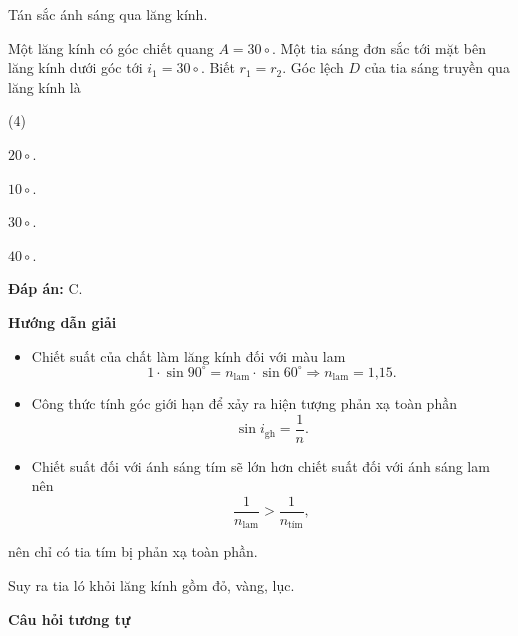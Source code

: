 \begin{dang}{Tán sắc ánh sáng qua lăng kính.}
{		Một lăng kính có góc chiết quang $ A = 30\circ $. Một tia sáng đơn sắc tới mặt bên lăng kính dưới góc tới $ i_{1} = 30\circ $. Biết $ r_{1} = r_{2} $. Góc lệch $ D $ của tia sáng truyền qua lăng kính là
		\begin{mcq}(4)
			\item $ 20 \circ $.
			\item $ 10 \circ $.
			\item $ 30 \circ $.
			\item $ 40 \circ $.
		\end{mcq}
		
		\textbf{Đáp án:} C.
	}
	
	{	\begin{center}
			\textbf{Hướng dẫn giải}
		\end{center}
		
		\begin{itemize}
			\item Chiết suất của chất làm lăng kính đối với màu lam
			\begin{equation*}
				1 \cdot \sin 90^\circ = n_{\text{lam}} \cdot \sin 60^\circ \Rightarrow n_{\text{lam}}=\text{1,15}.
			\end{equation*}
			\item Công thức tính góc giới hạn để xảy ra hiện tượng phản xạ toàn phần
			\begin{equation*}
				\sin i_{\text{gh}}=\dfrac{1}{n}.
			\end{equation*}
			\item Chiết suất đối với ánh sáng tím sẽ lớn hơn chiết suất đối với ánh sáng lam nên 
			\begin{equation*}
				\dfrac{1}{n_{\text{lam}}}>\dfrac{1}{n_{\text{tím}}},
			\end{equation*}
		\end{itemize}
		
		nên chỉ có tia tím bị phản xạ toàn phần.
		
		Suy ra tia ló khỏi lăng kính gồm đỏ, vàng, lục.
		
		\begin{center}
			\textbf{Câu hỏi tương tự}
		\end{center}
		
}
\end{dang}

